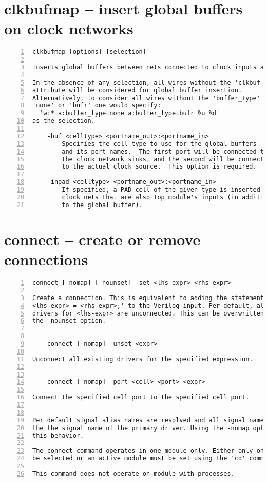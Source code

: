 \section{clkbufmap -- insert global buffers on clock networks}
\label{cmd:clkbufmap}
\begin{lstlisting}[numbers=left,frame=single]
    clkbufmap [options] [selection]

Inserts global buffers between nets connected to clock inputs and their drivers.

In the absence of any selection, all wires without the 'clkbuf_inhibit'
attribute will be considered for global buffer insertion.
Alternatively, to consider all wires without the 'buffer_type' attribute set to
'none' or 'bufr' one would specify:
  'w:* a:buffer_type=none a:buffer_type=bufr %u %d'
as the selection.

    -buf <celltype> <portname_out>:<portname_in>
        Specifies the cell type to use for the global buffers
        and its port names.  The first port will be connected to
        the clock network sinks, and the second will be connected
        to the actual clock source.  This option is required.

    -inpad <celltype> <portname_out>:<portname_in>
        If specified, a PAD cell of the given type is inserted on
        clock nets that are also top module's inputs (in addition
        to the global buffer).
\end{lstlisting}

\section{connect -- create or remove connections}
\label{cmd:connect}
\begin{lstlisting}[numbers=left,frame=single]
    connect [-nomap] [-nounset] -set <lhs-expr> <rhs-expr>

Create a connection. This is equivalent to adding the statement 'assign
<lhs-expr> = <rhs-expr>;' to the Verilog input. Per default, all existing
drivers for <lhs-expr> are unconnected. This can be overwritten by using
the -nounset option.


    connect [-nomap] -unset <expr>

Unconnect all existing drivers for the specified expression.


    connect [-nomap] -port <cell> <port> <expr>

Connect the specified cell port to the specified cell port.


Per default signal alias names are resolved and all signal names are mapped
the the signal name of the primary driver. Using the -nomap option deactivates
this behavior.

The connect command operates in one module only. Either only one module must
be selected or an active module must be set using the 'cd' command.

This command does not operate on module with processes.
\end{lstlisting}

